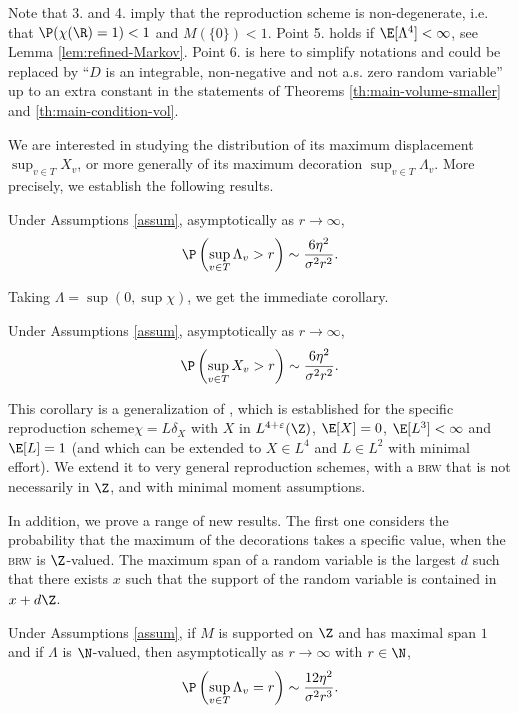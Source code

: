 \documentclass[10pt,a4paper]{article}
\newcommand{\brw}{\textsc{brw}\xspace}
\newcommand{\repscheme}{reproduction scheme\xspace}
\newcommand{\repschemes}{reproduction schemes\xspace}
\begin{document}
Note that 3. and 4. imply that the \repscheme is non-degenerate, i.e. that $\P(\chi(\R) = 1) < 1$ and $M(\{0\}) < 1$. Point 5. holds if $\E[\Lambda^4]<\infty$, see Lemma \ref{lem:refined-Markov}. Point 6. is here to simplify notations and could be replaced by ``$D$ is an integrable, non-negative and not a.s. zero random variable'' up to an extra constant in the statements of Theorems \ref{th:main-volume-smaller} and \ref{th:main-condition-vol}.


We are interested in studying the distribution of its maximum displacement $\sup_{v\in T} X_v$, or more generally of its maximum decoration $\sup_{v\in T} \Lambda_v$. More precisely, we establish the following results. 


\begin{theorem}\label{th:main-tail}
Under Assumptions \ref{assum}, asymptotically as $r\to\infty$, 
\[ \P\left(\sup_{v\in T} \Lambda_v > r\right) \sim \frac{6\eta^2}{\sigma^2 r^2} . \]
\end{theorem}

Taking $\Lambda = \sup(0, \sup\chi)$, we get the immediate corollary. 

\begin{corollary}\label{cor:main-tail}
Under Assumptions \ref{assum}, asymptotically as $r\to\infty$, 
\[ \P\left(\sup_{v\in T} X_v > r\right) \sim \frac{6\eta^2}{\sigma^2 r^2} . \]
\end{corollary}

This corollary is a generalization of \cite[Theorem 1]{lalley2015maximal}, which is established for the specific \repscheme $\chi = L \delta_X$ with $X$ in $L^{4+\varepsilon}(\Z)$, $\E[X]=0$, $\E[L^3]<\infty$ and $\E[L]=1$ (and which can be extended to $X\in L^4$ and $L\in L^2$ with minimal effort). We extend it to very general \repschemes, with a \brw that is not necessarily in $\Z$, and with minimal moment assumptions. 


In addition, we prove a range of new results. The first one considers the probability that the maximum of the decorations takes a specific value, when the \brw is $\Z$-valued. The maximum span of a random variable is the largest $d$ such that there exists $x$ such that the support of the random variable is contained in $x+d\Z$. 


\begin{theorem}\label{th:main-condition}
Under Assumptions \ref{assum}, if $M$ is supported on $\Z$ and has maximal span $1$ and if $\Lambda$ is $\N$-valued, then asymptotically as $r\to\infty$ with $r\in \N$,  
\[ \P\left(\sup_{v\in T} \Lambda_v = r\right) \sim \frac{12 \eta^2}{\sigma^2 r^3} . \]
\end{theorem}
\end{document}
